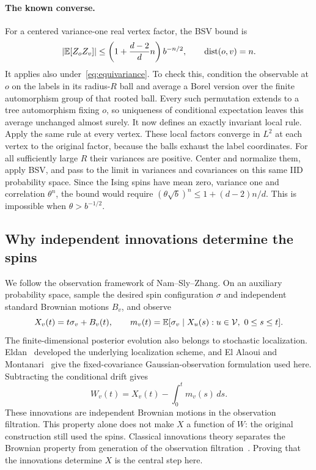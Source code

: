 \paragraph{The known converse.}
For a centered variance-one real vertex factor, the BSV bound is
\[
 |\mathbb E[Z_oZ_v]|\le
       \left(1+\frac{d-2}{d}n\right)b^{-n/2},
                  \qquad \operatorname{dist}(o,v)=n.
\]
It applies also under~\eqref{eq:equivariance}. To check this,
condition the observable at $o$ on the labels in its radius-$R$ ball
and average a Borel version over the finite automorphism group of that
rooted ball. Every such permutation extends to a tree automorphism
fixing $o$, so uniqueness of conditional expectation leaves this
average unchanged almost surely. It now defines an exactly invariant
local rule. Apply the same rule at every vertex. These local factors
converge in $L^2$ at each vertex to the original factor, because the
balls exhaust the label coordinates. For all sufficiently large $R$
their variances are positive. Center and normalize them, apply BSV,
and pass to the limit in variances and covariances on this same IID
probability space. Since the Ising spins have mean zero, variance one
and correlation $\theta^n$, the bound would require
$(\theta\sqrt b)^n\le1+(d-2)n/d$. This is impossible when
$\theta>b^{-1/2}$.

\subsection{Why independent innovations determine the spins}

We follow the observation framework of Nam--Sly--Zhang. On an auxiliary
probability space, sample the desired spin configuration $\sigma$ and
independent standard Brownian motions $B_v$, and observe
\[
 X_v(t)=t\sigma_v+B_v(t),\qquad
 m_v(t)=\mathbb E[\sigma_v\mid X_u(s):u\in\mathcal V,\ 0\le s\le t].
\]
The finite-dimensional posterior evolution also belongs to stochastic
localization. Eldan~\cite{Eldan2013} developed the underlying localization
scheme, and El Alaoui and Montanari~\cite[Section~3, Theorem~2]{ElAlaouiMontanari2022}
give the fixed-covariance Gaussian-observation formulation used here.
Subtracting the conditional drift gives
\[
                      W_v(t)=X_v(t)-\int_0^t m_v(s)\,ds.
\]
These innovations are independent Brownian motions in the observation
filtration. This property alone does not make $X$ a function of $W$:
the original construction still used the spins. Classical innovations
theory separates the Brownian property from generation of the
observation filtration~\cite[Lemma~2.2 and Remark~2.2]{FujisakiKallianpurKunita1972}.
Proving that the innovations determine $X$ is the central step here.

